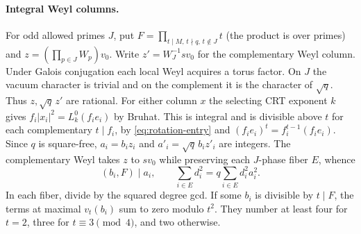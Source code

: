 \documentclass[11pt]{amsart}
\numberwithin{equation}{section}
\theoremstyle{definition}
\theoremstyle{plain}
\begin{document}
\paragraph{Integral Weyl columns.}
For odd allowed primes $J$, put $F=\prod_{t\mid M,\,t\nmid q,\,t\notin J}t$
(the product is over primes) and $z=(\prod_{p\in J}W_p)v_0$.
Write $z'=W_J^{-1}sv_0$ for the complementary Weyl column.
Under Galois conjugation each local Weyl acquires a torus factor.
On $J$ the vacuum character is trivial and on the complement it
is the character of $\sqrt q$. Thus $z,\sqrt q\,z'$ are rational.
For either column $x$ the selecting CRT exponent $k$ gives
$f_i|x_i|^2=L_k^0(f_ie_i)$ by Bruhat. This is integral and is
divisible above $t$ for each complementary $t\mid f_i$, by
\eqref{eq:rotation-entry} and $(f_ie_i)^t=f_i^{t-1}(f_ie_i)$.
Since $q$ is square-free, $a_i=b_i z_i$ and $a'_i=\sqrt q\,b_i z'_i$
are integers. The complementary Weyl takes $z$ to $sv_0$ while
preserving each $J$-phase fiber $E$, whence
\begin{equation}\label{eq:phase-column}
 (b_i,F)\mid a_i,\qquad
 \sum_{i\in E}d_i^2=q\sum_{i\in E}d_i^2a_i^2 .
\end{equation}
In each fiber, divide by the squared degree gcd. If some $b_i$ is
divisible by $t\mid F$, the terms at maximal $v_t(b_i)$ sum to
zero modulo $t^2$. They number at least four for $t=2$, three
for $t\equiv3\pmod4$, and two otherwise.
\end{document}
